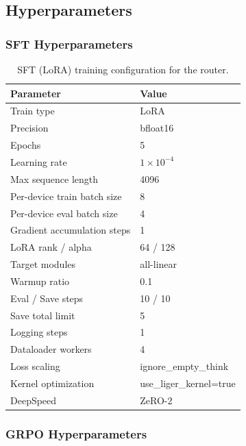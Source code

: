 \documentclass{article}
\theoremstyle{plain}
\theoremstyle{definition}
\theoremstyle{remark}
\begin{document}
\subsection{Hyperparameters}
\label{app:router_hparams}

\subsubsection{SFT Hyperparameters}
\label{app:router_sft_hparams}

\begin{table}[H]
\centering
\small
\begin{tabular}{ll}
\toprule
Parameter & Value \\
\midrule
Train type & LoRA \\
Precision & bfloat16 \\
Epochs & 5 \\
Learning rate & $1\times 10^{-4}$ \\
Max sequence length & 4096 \\
Per-device train batch size & 8 \\
Per-device eval batch size & 4 \\
Gradient accumulation steps & 1 \\
LoRA rank / alpha & 64 / 128 \\
Target modules & all-linear \\
Warmup ratio & 0.1 \\
Eval / Save steps & 10 / 10 \\
Save total limit & 5 \\
Logging steps & 1 \\
Dataloader workers & 4 \\
Loss scaling & ignore\_empty\_think \\
Kernel optimization & use\_liger\_kernel=true \\
DeepSpeed & ZeRO-2 \\
\bottomrule
\end{tabular}
\caption{SFT (LoRA) training configuration for the router.}
\end{table}

\subsubsection{GRPO Hyperparameters}
\label{app:router_grpo_hparams}
\end{document}

